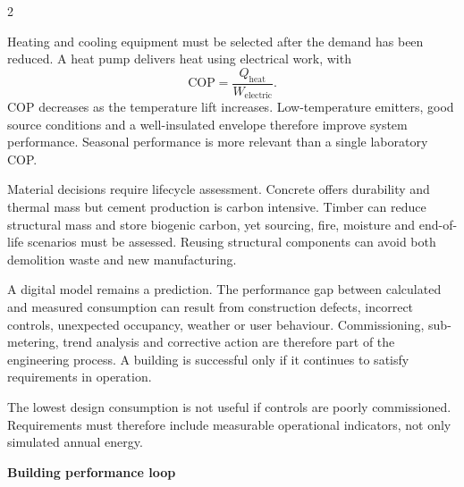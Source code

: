 \begin{multicols}{2}
\begin{ecarticle}
Heating and cooling equipment must be selected after the demand has been reduced. A heat pump delivers heat using
electrical work, with
\[
\mathrm{COP}=\frac{Q_{\mathrm{heat}}}{W_{\mathrm{electric}}}.
\]
COP decreases as the temperature lift increases. Low-temperature emitters, good source conditions and a well-insulated
envelope therefore improve system performance. Seasonal performance is more relevant than a single laboratory COP.

Material decisions require lifecycle assessment. Concrete offers durability and thermal mass but cement production
is carbon intensive. Timber can reduce structural mass and store biogenic carbon, yet sourcing, fire, moisture and
end-of-life scenarios must be assessed. Reusing structural components can avoid both demolition waste and new
manufacturing.

A digital model remains a prediction. The performance gap between calculated and measured consumption can result
from construction defects, incorrect controls, unexpected occupancy, weather or user behaviour. Commissioning,
sub-metering, trend analysis and corrective action are therefore part of the engineering process. A building is
successful only if it continues to satisfy requirements in operation.
\end{ecarticle}

\begin{tcolorbox}[title=\sffamily\bfseries Engineering insight,colback=yellow!10,colframe=ECOrange]
The lowest design consumption is not useful if controls are poorly commissioned. Requirements must therefore include
measurable operational indicators, not only simulated annual energy.
\end{tcolorbox}

\begin{engineeringfocus}
\textbf{Building performance loop}
\begin{center}
\end{center}
\end{engineeringfocus}


\end{multicols}

